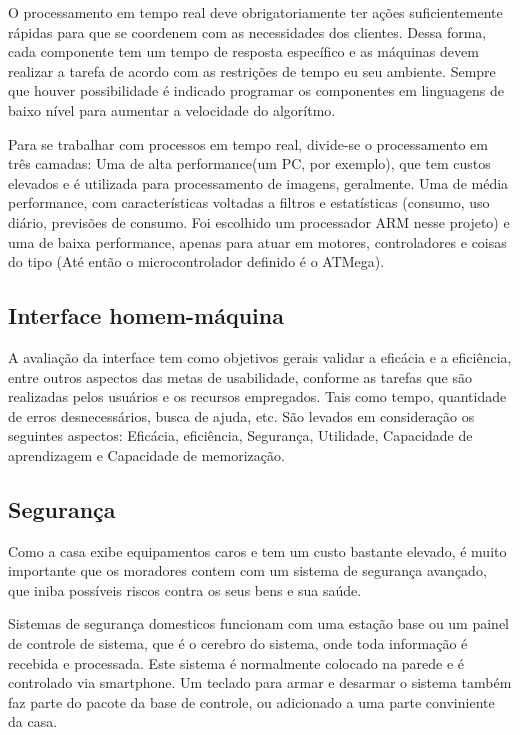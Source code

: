 	O processamento em tempo real deve obrigatoriamente ter ações suficientemente rápidas para que se coordenem com as necessidades dos clientes\cite{2014SiqueiraFraga}. Dessa forma, cada componente tem um tempo de resposta específico e as máquinas devem realizar a tarefa de acordo com as restrições de tempo eu seu ambiente\cite{brookshear2013ciencia}. Sempre que houver possibilidade é indicado programar os componentes em linguagens de baixo nível para aumentar a velocidade do algorítmo\cite{2014SiqueiraFraga2}.

	Para se trabalhar com processos em tempo real, divide-se o processamento em três camadas: Uma de alta performance(um PC, por exemplo), que tem custos elevados e é utilizada para processamento de imagens, geralmente. Uma de média performance, com características voltadas a filtros e estatísticas (consumo, uso diário, previsões de consumo. Foi escolhido um processador ARM nesse projeto) e uma de baixa performance, apenas para atuar em motores, controladores e coisas do tipo (Até então o microcontrolador definido é o ATMega).

\subsection{Interface homem-máquina}

	A avaliação da interface tem como objetivos gerais validar a eficácia e a eficiência, entre outros aspectos das metas de usabilidade, conforme as tarefas que são realizadas pelos usuários e os recursos empregados. Tais como tempo, quantidade de erros desnecessários, busca de ajuda, etc. São levados em consideração os seguintes aspectos: Eficácia, eficiência, Segurança, Utilidade, Capacidade de aprendizagem e Capacidade de memorização.

\subsection{Segurança}

	Como a casa exibe equipamentos caros e tem um custo bastante elevado, é muito importante que os moradores contem com um sistema de segurança avançado, que iniba possíveis riscos contra os seus bens e sua saúde.

	Sistemas de segurança domesticos funcionam com uma estação base ou um painel de controle de sistema, que é o cerebro do sistema, onde toda informação é recebida e processada.  Este sistema é normalmente colocado na parede e é controlado via smartphone. Um teclado para armar e desarmar o sistema também faz parte do pacote da base de controle, ou adicionado a uma parte conviniente da casa.


